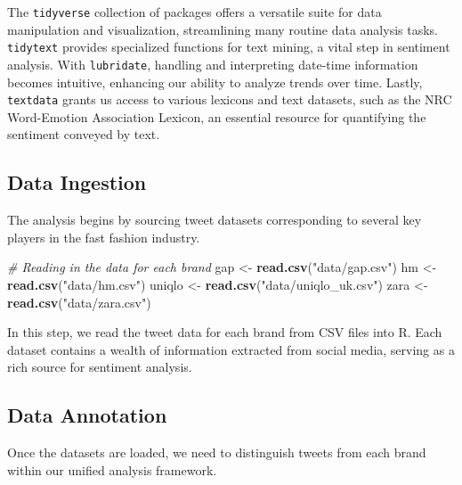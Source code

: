 \documentclass[
]{book}
\newenvironment{Shaded}{\begin{snugshade}}{\end{snugshade}}
\newcommand{\CommentTok}[1]{\textcolor[rgb]{0.56,0.35,0.01}{\textit{#1}}}
\newcommand{\FunctionTok}[1]{\textcolor[rgb]{0.13,0.29,0.53}{\textbf{#1}}}
\newcommand{\NormalTok}[1]{#1}
\newcommand{\OtherTok}[1]{\textcolor[rgb]{0.56,0.35,0.01}{#1}}
\newcommand{\SpecialCharTok}[1]{\textcolor[rgb]{0.81,0.36,0.00}{\textbf{#1}}}
\newcommand{\StringTok}[1]{\textcolor[rgb]{0.31,0.60,0.02}{#1}}
\begin{document}
The \texttt{tidyverse} collection of packages offers a versatile suite for data manipulation and visualization, streamlining many routine data analysis tasks. \texttt{tidytext} provides specialized functions for text mining, a vital step in sentiment analysis. With \texttt{lubridate}, handling and interpreting date-time information becomes intuitive, enhancing our ability to analyze trends over time. Lastly, \texttt{textdata} grants us access to various lexicons and text datasets, such as the NRC Word-Emotion Association Lexicon, an essential resource for quantifying the sentiment conveyed by text.

\hypertarget{data-ingestion}{%
\subsection{Data Ingestion}\label{data-ingestion}}

The analysis begins by sourcing tweet datasets corresponding to several key players in the fast fashion industry.

\begin{Shaded}
\begin{Highlighting}[]
\CommentTok{\# Reading in the data for each brand}
\NormalTok{gap }\OtherTok{\textless{}{-}} \FunctionTok{read.csv}\NormalTok{(}\StringTok{"data/gap.csv"}\NormalTok{)}
\NormalTok{hm }\OtherTok{\textless{}{-}} \FunctionTok{read.csv}\NormalTok{(}\StringTok{"data/hm.csv"}\NormalTok{)}
\NormalTok{uniqlo }\OtherTok{\textless{}{-}} \FunctionTok{read.csv}\NormalTok{(}\StringTok{"data/uniqlo\_uk.csv"}\NormalTok{)}
\NormalTok{zara }\OtherTok{\textless{}{-}} \FunctionTok{read.csv}\NormalTok{(}\StringTok{"data/zara.csv"}\NormalTok{)}
\end{Highlighting}
\end{Shaded}

In this step, we read the tweet data for each brand from CSV files into R. Each dataset contains a wealth of information extracted from social media, serving as a rich source for sentiment analysis.

\hypertarget{data-annotation}{%
\subsection{Data Annotation}\label{data-annotation}}

Once the datasets are loaded, we need to distinguish tweets from each brand within our unified analysis framework.

\begin{Shaded}
\end{Shaded}
\end{document}
